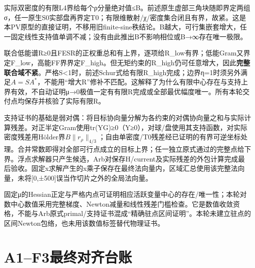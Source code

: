 \documentclass[
  10pt,
  a4paper,
]{article}
\begin{document}
实际双密度的有限L4界给每个ρ分量绝对值≤B。前述原生虚部三角块随即界定两组σ，任一原生S0实部盘再界定T0；有限维散射/χ/密度集合闭且有界，故紧。这是本PV原型的直接证明，不移用旧finite-sine秩结论。B越大，可行集嵌套增大，任一固定线性支持值单调不减；没有由此推出B不影响相位或B→∞存在唯一极限。

联合低能谱R≥0且FESR的正权重总和有上界，逐项给R\_low有界；低能Gram又界定F\_low，高能FF界界定F\_high。但无矩约束的R\_high仍可任意增大，因此\textbf{完整联合域不紧}。严格\textbar S\textbar\textless1时，前述Schur式给有限R\_high完成；边界η=1时须另外满足\(A=SA^*\)，不能用``增大R''修补不匹配。这解释了为什么有限中心存在与支持上界有效，不自动证明μ→0极值一定有有限R完成或全部最优幅度唯一。所有本轮交付点均保存并核验了实际有限R。

支持证书的基础是弱对偶：将目标协向量分解为各约束的对偶协向量之和与实际计算残差。对正半定Gram使用tr(YG)≥0（Y≥0），对球/盘使用其支持函数，对实际密度残差用Hölder界\(B\|r_\rho\|_{4/3}\)；自由单密度/T0残差经已证明的有界可逆坐标处理。合并常数即得对全部可行点成立的目标上界；任一独立原式通过的完整点给下界。浮点求解器只产生候选，Arb对保存H/current及实际残差的外包计算完成最后验收。固定x求解产生的x乘子保存在最终法向量内，区域汇总使用该完整法向量，未将{[}0,±500{]}误当作切片之外的全局法向量。

固定μ的Hessian正定与严格内点可证明相应活跃变量中心的存在/唯一性；本轮对数中心数值采用完整梯度、Newton减量和线性残差门槛检查。它是数值收敛资格，不能与Arb原式primal/支持证书混成``精确驻点区间证明''。本轮未建立驻点的区间Newton包络，也未用该数值标签替代物理证书。

\section{A1--F3最终对齐台账}\label{a1f3ux6700ux7ec8ux5bf9ux9f50ux53f0ux8d26}
\end{document}
